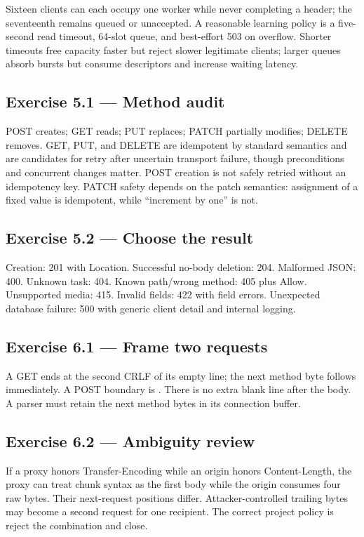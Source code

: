 Sixteen clients can each occupy one worker while never completing a header; the
seventeenth remains queued or unaccepted. A reasonable learning policy is a
five-second read timeout, 64-slot queue, and best-effort 503 on overflow. Shorter
timeouts free capacity faster but reject slower legitimate clients; larger queues
absorb bursts but consume descriptors and increase waiting latency.

\subsection*{Exercise 5.1 --- Method audit}

POST creates; GET reads; PUT replaces; PATCH partially modifies; DELETE removes.
GET, PUT, and DELETE are idempotent by standard semantics and are candidates for
retry after uncertain transport failure, though preconditions and concurrent
changes matter. POST creation is not safely retried without an idempotency key.
PATCH safety depends on the patch semantics: assignment of a fixed value is
idempotent, while ``increment by one'' is not.

\subsection*{Exercise 5.2 --- Choose the result}

Creation: 201 with Location. Successful no-body deletion: 204. Malformed JSON:
400. Unknown task: 404. Known path/wrong method: 405 plus Allow. Unsupported
media: 415. Invalid fields: 422 with field errors. Unexpected database failure:
500 with generic client detail and internal logging.

\subsection*{Exercise 6.1 --- Frame two requests}

A GET ends at the second CRLF of its empty line; the next method byte follows
immediately. A POST boundary is . There is no
extra blank line after the body. A parser must retain the next method bytes in
its connection buffer.

\subsection*{Exercise 6.2 --- Ambiguity review}

If a proxy honors Transfer-Encoding while an origin honors Content-Length, the
proxy can treat chunk syntax as the first body while the origin consumes four
raw bytes. Their next-request positions differ. Attacker-controlled trailing
bytes may become a second request for one recipient. The correct project policy
is reject the combination and close.

